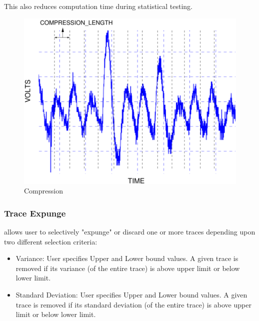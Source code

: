 \documentclass{llncs}
\numberwithin{algorithm}{chapter}
\begin{document}
This also reduces computation time during statistical testing.

\begin{figure}[ht]
\begin{center}
\includegraphics[scale=0.6]{figures/compression}
\caption{\label{fig:cmp}Compression}
\end{center} 
\vspace{-3ex}
\end{figure}

\subsubsection{Trace Expunge} allows user to selectively "expunge" or discard one or more traces 
depending upon two different selection criteria:

\begin{itemize}
\item Variance: User specifies Upper and Lower bound values. A given trace is removed if its variance (of the entire trace)
is above upper limit or below lower limit.
\item Standard Deviation: User specifies Upper and Lower bound values. A given trace is removed if its standard 
deviation (of the entire trace) is above upper limit or below lower limit.
\end{itemize}
\end{document}
